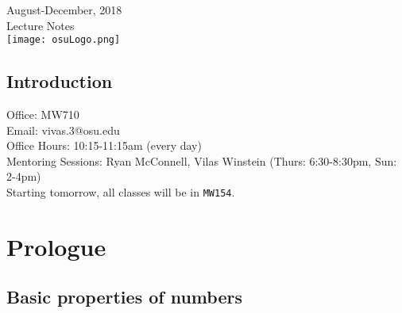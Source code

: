 \documentclass[12pt]{amsbook}
\theoremstyle{plain}
\numberwithin{section}{chapter}
\numberwithin{equation}{chapter}
\theoremstyle{definition}
\theoremstyle{remark}
\theoremstyle{plain}
\begin{document}
\begin{titlepage}



{\large \hspace{1mm} August-December, 2018 \\ \hspace{3mm} Lecture Notes}\\[1cm]


\vspace{15mm}
\texttt{[image: osuLogo.png]}\\[1cm] %
 

\vfill %

\end{titlepage}

\section{Introduction}
Office: MW710\\
Email: vivas.3@osu.edu\\
Office Hours: 10:15-11:15am (every day)\\
Mentoring Sessions: Ryan McConnell, Vilas Winstein (Thurs: 6:30-8:30pm, Sun: 2-4pm)\\
Starting tomorrow, all classes will be in \texttt{MW154}. 


\chapter{Prologue}

\section{Basic properties of numbers}
\end{document}
